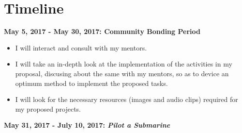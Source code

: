 \documentclass[preprint,12pt]{elsarticle}
\begin{document}
\section{Timeline}
\label{S:1}

\textbf{May 5, 2017 - May 30, 2017: Community Bonding Period}

\begin{itemize}
\item I will interact and consult with my mentors.
\item I will take an in-depth look at the implementation of the activities in my proposal, discusing about the same with my mentors, so as to device an optimum method to implement the proposed tasks.
\item I will look for the necessary resources (images and audio clips) required for my proposed projects.
\end{itemize}

\textbf{May 31, 2017 - July 10, 2017: \textit{Pilot a Submarine}}
\end{document}
